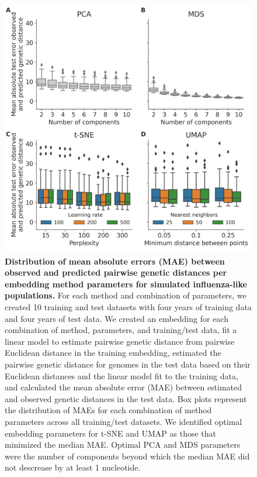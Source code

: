 \begin{figure}[!h]
  \includegraphics[width=0.9\columnwidth]{figures/simulated-influenza-like-with-no-reassortment-scores-by-parameters.png}
  \caption{{\bf Distribution of mean absolute errors (MAE) between observed and predicted pairwise genetic distances per embedding method parameters for simulated influenza-like populations.}
    For each method and combination of parameters, we created 10 training and test datasets with four years of training data and four years of test data.
    We created an embedding for each combination of method, parameters, and training/test data, fit a linear model to estimate pairwise genetic distance from pairwise Euclidean distance in the training embedding, estimated the pairwise genetic distance for genomes in the test data based on their Euclidean distances and the linear model fit to the training data, and calculated the mean absolute error (MAE) between estimated and observed genetic distances in the test data.
    Box plots represent the distribution of MAEs for each combination of method parameters across all training/test datasets.
    We identified optimal embedding parameters for t-SNE and UMAP as those that minimized the median MAE.
    Optimal PCA and MDS parameters were the number of components beyond which the median MAE did not descrease by at least 1 nucleotide.
  }\label{S_Fig_simulated_flu_errors}
\end{figure}

